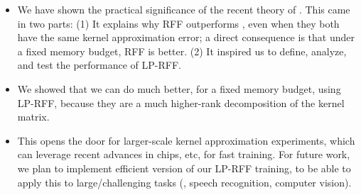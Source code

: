 \begin{itemize}
	\item We have shown the practical significance of the recent theory of \citep{avron17}.  This came in two parts: (1) It explains why RFF outperforms \NystromNS, even when they both have the same kernel approximation error; a direct consequence is that under a fixed memory budget, RFF is better. (2) It inspired us to define, analyze, and test the performance of LP-RFF.
	\item We showed that we can do much better, for a fixed memory budget, using LP-RFF, because they are a much higher-rank decomposition of the kernel matrix.
	\item This opens the door for larger-scale kernel approximation experiments, which can leverage recent advances in chips, etc, for fast training.  For future work, we plan to implement efficient version of our LP-RFF training, to be able to apply this to large/challenging tasks (\eg, speech recognition, computer vision).
\end{itemize}